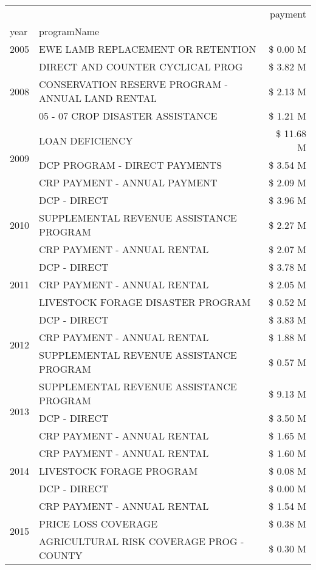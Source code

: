 \begin{tabular}{llr}
\toprule
 &  & payment \\
year & programName &  \\
\midrule
2005 & EWE LAMB REPLACEMENT OR RETENTION & \$ 0.00 M \\
\cline{1-3}
\multirow[t]{3}{*}{2008} & DIRECT AND COUNTER CYCLICAL PROG & \$ 3.82 M \\
 & CONSERVATION RESERVE PROGRAM - ANNUAL LAND RENTAL & \$ 2.13 M \\
 & 05 - 07 CROP DISASTER ASSISTANCE & \$ 1.21 M \\
\cline{1-3}
\multirow[t]{3}{*}{2009} & LOAN DEFICIENCY & \$ 11.68 M \\
 & DCP PROGRAM - DIRECT PAYMENTS & \$ 3.54 M \\
 & CRP PAYMENT - ANNUAL PAYMENT & \$ 2.09 M \\
\cline{1-3}
\multirow[t]{3}{*}{2010} & DCP - DIRECT & \$ 3.96 M \\
 & SUPPLEMENTAL REVENUE ASSISTANCE PROGRAM & \$ 2.27 M \\
 & CRP PAYMENT - ANNUAL RENTAL & \$ 2.07 M \\
\cline{1-3}
\multirow[t]{3}{*}{2011} & DCP - DIRECT & \$ 3.78 M \\
 & CRP PAYMENT - ANNUAL RENTAL & \$ 2.05 M \\
 & LIVESTOCK FORAGE DISASTER PROGRAM & \$ 0.52 M \\
\cline{1-3}
\multirow[t]{3}{*}{2012} & DCP - DIRECT & \$ 3.83 M \\
 & CRP PAYMENT - ANNUAL RENTAL & \$ 1.88 M \\
 & SUPPLEMENTAL REVENUE ASSISTANCE PROGRAM & \$ 0.57 M \\
\cline{1-3}
\multirow[t]{3}{*}{2013} & SUPPLEMENTAL REVENUE ASSISTANCE PROGRAM & \$ 9.13 M \\
 & DCP - DIRECT & \$ 3.50 M \\
 & CRP PAYMENT - ANNUAL RENTAL & \$ 1.65 M \\
\cline{1-3}
\multirow[t]{3}{*}{2014} & CRP PAYMENT - ANNUAL RENTAL & \$ 1.60 M \\
 & LIVESTOCK FORAGE PROGRAM & \$ 0.08 M \\
 & DCP - DIRECT & \$ 0.00 M \\
\cline{1-3}
\multirow[t]{3}{*}{2015} & CRP PAYMENT - ANNUAL RENTAL & \$ 1.54 M \\
 & PRICE LOSS COVERAGE & \$ 0.38 M \\
 & AGRICULTURAL RISK COVERAGE PROG - COUNTY & \$ 0.30 M \\

\end{tabular}
